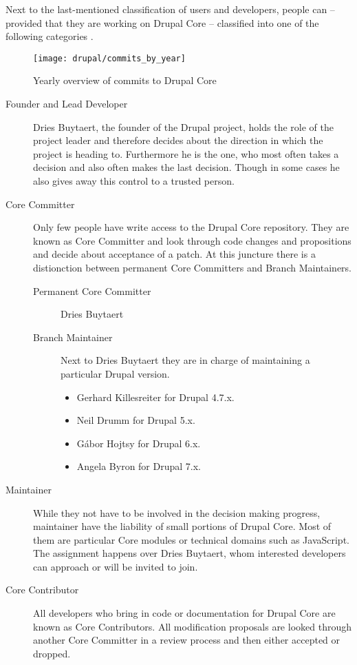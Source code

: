Next to the last-mentioned classification of users and developers, people can
-- provided that they are working on Drupal Core -- classified into one of the
following categories \cite{DrupalCoreDevelopers}.

\begin{figure}[htbp]
  \centering
  \texttt{[image: drupal/commits\_by\_year]}
  \caption{Yearly overview of commits to Drupal Core}
\end{figure}

\begin{description}

  \item[Founder and Lead Developer] Dries Buytaert, the founder of the Drupal
    project, holds the role of the project leader and therefore decides about
    the direction in which the project is heading to. Furthermore he is the
    one, who most often takes a decision and also often makes the last
    decision. Though in some cases he also gives away this control to a trusted
    person.

  \item[Core Committer] Only few people have write access to the Drupal Core
    repository. They are known as Core Committer and look through code changes
    and propositions and decide about acceptance of a patch. At this juncture
    there is a distionction between permanent Core Committers and Branch
    Maintainers.

    \begin{description}
      \item[Permanent Core Committer] Dries Buytaert
      \item[Branch Maintainer] Next to Dries Buytaert they are in charge of
      maintaining a particular Drupal version.
      \begin{itemize}
        \item Gerhard Killesreiter for Drupal 4.7.x.
        \item Neil Drumm for Drupal 5.x.
        \item Gábor Hojtsy for Drupal 6.x.
        \item Angela Byron for Drupal 7.x.
      \end{itemize}
    \end{description}

  \item[Maintainer] While they not have to be involved in the decision making
    progress, maintainer have the liability of small portions of Drupal Core.
    Most of them are particular Core modules or technical domains such as
    JavaScript. The assignment happens over Dries Buytaert, whom interested
    developers can approach or will be invited to join.

  \item[Core Contributor] All developers who bring in code or documentation for
    Drupal Core are known as Core Contributors. All modification proposals are
    looked through another Core Committer in a review process and then either
    accepted or dropped.

\end{description}

